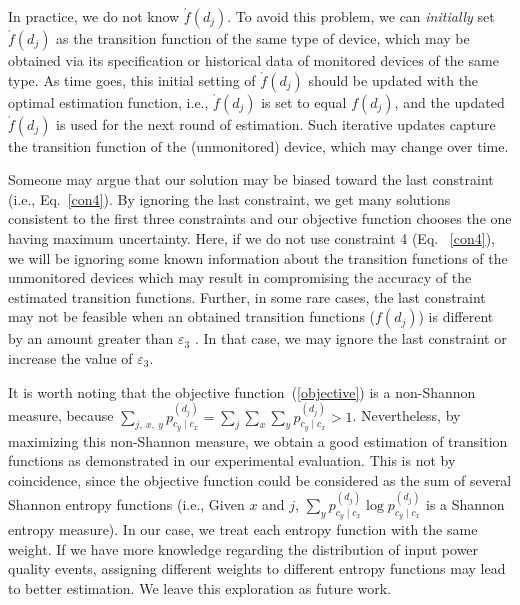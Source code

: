 \begin{remark}
In practice, we do not know $\acute{f}(d_j)$. To avoid this problem, we can \textit{initially} set $\acute{f}(d_j)$ as the transition function of the same type of device, which may be obtained via its specification or historical data of monitored devices of the same type. As time goes, this initial setting of $\acute{f}(d_j)$ should be updated with the optimal estimation function, i.e., $\acute{f}(d_j)$ is set to equal $f(d_j)$, and the updated $\acute{f}(d_j)$ is used for the next round of estimation. Such iterative updates capture the transition function of the (unmonitored) device, which may change over time.
\end{remark}

\begin{remark}
Someone may argue that our solution may be biased toward the last constraint (i.e., Eq.~\ref{con4}). By ignoring the last constraint, we get many solutions consistent to the first three constraints and our objective function chooses the one having maximum uncertainty. Here, if we do not use constraint 4 (Eq. ~\ref{con4}), we will be ignoring some known information about the transition functions of the unmonitored devices which may result in compromising the accuracy of the estimated transition functions. Further, in some rare cases, the last constraint may not be feasible when an obtained transition functions ($f(d_j)$) is different by an amount greater than $\varepsilon_3$ . In that case, we may ignore the last constraint or increase the value of $\varepsilon_3$.
\end{remark}

\begin{remark}
It is worth noting that the objective function~(\ref{objective}) is a non-Shannon measure, because $\sum_{j, ~x, ~y} p_{c_y \mid c_x}^{(d_j)} = \sum_{j}\sum_{x}\sum_{y} p_{c_y \mid c_x}^{(d_j)} >1$. Nevertheless, by maximizing this non-Shannon measure, we obtain a good estimation of transition functions as demonstrated in our experimental evaluation. This is not by coincidence, since the objective function could be considered as the sum of several Shannon entropy functions (i.e., Given $x$ and $j$, $\sum_{y} p_{c_y \mid c_x}^{(d_j)}\log p_{c_y \mid c_x}^{(d_j)}$ is a Shannon entropy measure). In our case, we treat each entropy function with the same weight. If we have more knowledge regarding the distribution of input power quality events, assigning different weights to different entropy functions may lead to better estimation. We leave this exploration as future work.  \end{remark}


